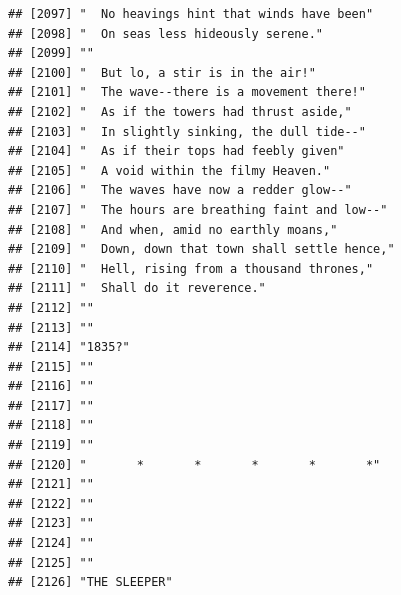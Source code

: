 \documentclass{article}\usepackage[]{graphicx}\usepackage[]{color}
\makeatletter
\newenvironment{kframe}{%
 \def\at@end@of@kframe{}%
 \ifinner\ifhmode%
  \def\at@end@of@kframe{\end{minipage}}%
  \begin{minipage}{\columnwidth}%
 \fi\fi%
 \def\FrameCommand##1{\hskip\@totalleftmargin \hskip-\fboxsep
 \colorbox{shadecolor}{##1}\hskip-\fboxsep
     \hskip-\linewidth \hskip-\@totalleftmargin \hskip\columnwidth}%
 \MakeFramed {\advance\hsize-\width
   \@totalleftmargin\z@ \linewidth\hsize
   \@setminipage}}%
 {\par\unskip\endMakeFramed%
 \at@end@of@kframe}
\newenvironment{knitrout}{}{} %
\makeatother
\begin{document}
\begin{knitrout}
\begin{kframe}
\begin{verbatim}
## [2097] "  No heavings hint that winds have been"                                     
## [2098] "  On seas less hideously serene."                                            
## [2099] ""                                                                            
## [2100] "  But lo, a stir is in the air!"                                             
## [2101] "  The wave--there is a movement there!"                                      
## [2102] "  As if the towers had thrust aside,"                                        
## [2103] "  In slightly sinking, the dull tide--"                                      
## [2104] "  As if their tops had feebly given"                                         
## [2105] "  A void within the filmy Heaven."                                           
## [2106] "  The waves have now a redder glow--"                                        
## [2107] "  The hours are breathing faint and low--"                                   
## [2108] "  And when, amid no earthly moans,"                                          
## [2109] "  Down, down that town shall settle hence,"                                  
## [2110] "  Hell, rising from a thousand thrones,"                                     
## [2111] "  Shall do it reverence."                                                    
## [2112] ""                                                                            
## [2113] ""                                                                            
## [2114] "1835?"                                                                       
## [2115] ""                                                                            
## [2116] ""                                                                            
## [2117] ""                                                                            
## [2118] ""                                                                            
## [2119] ""                                                                            
## [2120] "       *       *       *       *       *"                                    
## [2121] ""                                                                            
## [2122] ""                                                                            
## [2123] ""                                                                            
## [2124] ""                                                                            
## [2125] ""                                                                            
## [2126] "THE SLEEPER"                                                                 

\end{verbatim}
\end{kframe}
\end{knitrout}
\end{document}
